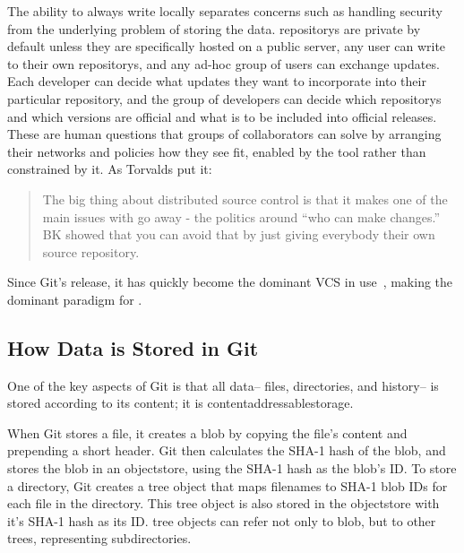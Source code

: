 The ability to always write locally separates concerns such as handling security
from the underlying problem of storing the data. \glspl{repository} are private
by default unless they are specifically hosted on a public server, any user can
write to their own \glspl{repository}, and any ad-hoc group of users can
exchange updates. Each developer can decide what updates they want to
incorporate into their particular \gls{repository}, and the group of developers
can decide which \glspl{repository} and which versions are official and what is
to be included into official releases. These are human questions that groups of
collaborators can solve by arranging their networks and policies how they see
fit, enabled by the tool rather than constrained by it. As Torvalds put it:

\blockcquote{git_10_years_interview}{The big thing about distributed source
    control is that it makes one of the main issues with  go
    away - the politics around \enquote{who can make changes.} BK
     showed that you can avoid that by just giving everybody
their own source \gls{repository}. }

Since Git's release, it has quickly become the dominant \gls{VCS} in
use~\cite{what_are_devs_talking_about}, making  the dominant paradigm for .

%


\subsection{How Data is Stored in Git}
\label{how-data-stored-in-git}

One of the key aspects of Git is that all data-- files, directories, and
history-- is stored according to its content; it is
\gls{contentaddressablestorage}.

When Git stores a file, it creates a \gls{blob} by copying the file's content
and prepending a short header. Git then calculates the SHA-1 hash of the
\gls{blob}, and stores the \gls{blob} in an \gls{objectstore}, using the SHA-1
hash as the \gls{blob}'s ID. To store a directory, Git creates a \gls{tree}
object that maps filenames to SHA-1 \gls{blob} IDs for each file in the
directory. This \gls{tree} object is also stored in the \gls{objectstore} with
it's SHA-1 hash as its ID. \Gls{tree} objects can refer not only to \gls{blob},
but to other \glspl{tree}, representing subdirectories.

